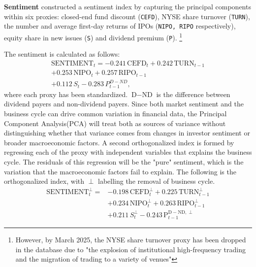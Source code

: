 \textbf{Sentiment}
 constructed a sentiment index by capturing the principal components within six proxies: closed-end fund discount (\texttt{CEFD}), NYSE share turnover (\texttt{TURN}), the number and average first-day returns of IPOs (\texttt{NIPO, RIPO} respectively), equity share in new issues (\texttt{S}) and dividend premium (\texttt{P}). \footnote{However, by March 2025, the NYSE share turnover proxy has been dropped in the database due to "the explosion of institutional high-frequency trading and the migration of trading to a variety of venues"}%

The sentiment is calculated as follows:
\begin{equation}
    \label{eq:sentiment}
    \begin{split}
    \text{SENTIMENT}_t = -0.241\,\text{CEFD}_t + 0.242\,\text{TURN}_{t-1} \\ + 0.253\,\text{NIPO}_t 
    + 0.257\,\text{RIPO}_{t-1} \\ + 0.112\,S_t - 0.283\,P^{D-ND}_{t-1} , 
    \end{split}
\end{equation}
where each proxy has been standardized. $\text{D}-\text{ND}$ is the difference between dividend payers and non-dividend payers. Since both market sentiment and the business cycle can drive common variation in financial data, the Principal Component Analysis(PCA) will treat both as sources of variance without distinguishing whether that variance comes from changes in investor sentiment or broader macroeconomic factors. A second orthogonalized index is formed by regressing each of the proxy with independent variables that explains the business cycle. The residuals of this regression will be the "pure" sentiment, which is the variation that the macroeconomic factors fail to explain. The following is the orthogonalized index, with $\perp$ labelling the removal of business cycle. 
\begin{equation} %
    \label{eq:sentiment_orth}
    \begin{split}
    \text{SENTIMENT}^{\perp}_t = &-0.198\,\text{CEFD}^{\perp}_t + 0.225\,\text{TURN}^{\perp}_{t-1} \\
    &+ 0.234\,\text{NIPO}^{\perp}_t + 0.263\,\text{RIPO}^{\perp}_{t-1} \\
    &+ 0.211\,S^{\perp}_t - 0.243\,\text{P}^{\text{D} - \text{ND},\perp}_{t-1}
    \end{split}
\end{equation}



